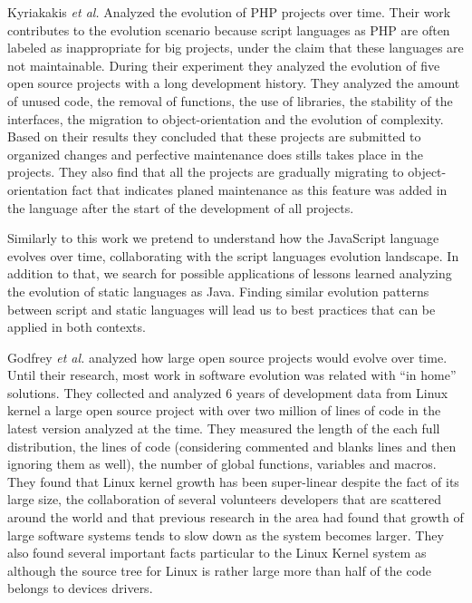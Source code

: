 Kyriakakis \emph{et al.} \cite{Kyriakakis2014ICMSE} Analyzed the evolution of PHP projects over time. Their work contributes to the evolution scenario because script languages as PHP are often labeled as inappropriate for big projects, under the claim that these languages are not maintainable. During their experiment they analyzed the evolution of five open source projects with a long development history. They analyzed the amount of unused code, the removal of functions, the use of libraries, the stability of the interfaces, the migration to object-orientation and the evolution of complexity. Based on their results they concluded that these projects are submitted to organized changes and perfective maintenance does stills takes place in the projects. They also find that all the projects are gradually migrating to object-orientation fact that indicates planed maintenance as this feature was added in the language after the start of the development of all projects. 

Similarly to this work we pretend to understand how the JavaScript language evolves over time, collaborating with the script languages evolution landscape. In addition to that, we search for possible applications of lessons learned analyzing the evolution of static languages as Java. Finding similar evolution patterns between script and static languages will lead us to best practices that can be applied in both contexts. 

Godfrey \emph{et al.} \cite{Godfrey2000ICMS} analyzed how large open source projects would evolve over time. Until their research, most work in software evolution was related with ``in home'' solutions. They collected and analyzed 6 years of development data from Linux kernel a large open source project with over two million of lines of code in the latest version analyzed at the time. They measured the length of the each full distribution, the lines of code (considering commented and blanks lines and then ignoring them as well), the number of global functions, variables and macros. They found that Linux kernel growth has been super-linear despite the fact of its large size, the collaboration of several volunteers developers that are scattered around the world and that previous research in the area had found that growth of large software systems tends to slow down as the system becomes larger. They also found several important facts particular to the Linux Kernel system as although the source tree for Linux is rather large more than half of the code belongs to devices drivers. 

